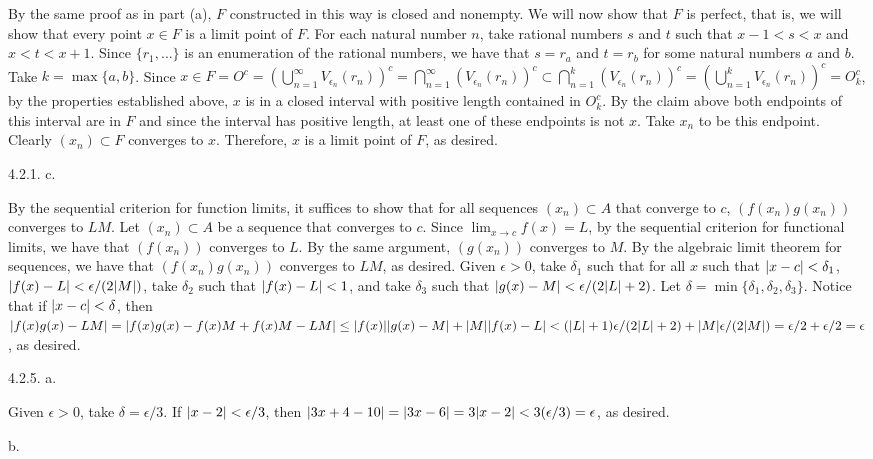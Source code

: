 By the same proof as in part (a),
$F$ constructed in this way is closed and nonempty.
We will now show that $F$ is perfect, that is,
we will show that every point $x \in F$
is a limit point of $F$.
For each natural number $n$,
take rational numbers $s$ and $t$ such that
$x - 1 < s < x$ and $x < t < x + 1$.
Since $\{r_1, \ldots\}$ is an enumeration of the rational numbers,
we have that $s = r_a$ and $t = r_b$ for some natural numbers $a$ and $b$.
Take $k = \max \{a, b\}$.
Since $x \in F = O^c = (\bigcup _{n=1} ^\infty V _{\epsilon _n} (r_n))^c =
\bigcap _{n=1} ^\infty (V _{\epsilon _n} (r_n))^c \subset
\bigcap _{n=1} ^k (V _{\epsilon _n} (r_n))^c =
(\bigcup _{n=1} ^k V _{\epsilon _n} (r_n))^c = O_k^c$,
by the properties established above,
$x$ is in a closed interval with positive length contained in $O_k^c$.
By the claim above both endpoints of this interval are in $F$
and since the interval has positive length, at least one of these endpoints
is not $x$.
Take $x_n$ to be this endpoint.
Clearly $(x_n) \subset F$ converges to $x$.
Therefore, $x$ is a limit point of $F$, as desired.
\bigskip
\item{4.2.1.} c.

By the sequential criterion for function limits, it suffices to show that
for all sequences $(x_n) \subset A$ that converge to $c$,
$(f(x_n) g(x_n))$ converges to $LM$.
Let $(x_n) \subset A$ be a sequence that converges to $c$.
Since $\lim _{x \to c} f(x) = L$,
by the sequential criterion for functional limits,
we have that $(f(x_n))$ converges to $L$.
By the same argument, $(g(x_n))$ converges to $M$.
By the algebraic limit theorem for sequences, we have that
$(f(x_n) g(x_n))$ converges to $LM$, as desired.
\medskip
Given $\epsilon > 0$, take $\delta _1$ such that
for all $x$ such that $\vert x - c\vert < \delta _1$,
$\vert f(x) - L\vert < \epsilon / (2 \vert M\vert)$,
take $\delta _2$ such that
$\vert f(x) - L\vert < 1$, and
take $\delta _3$ such that
$\vert g(x) - M\vert < \epsilon / (2 \vert L\vert + 2)$.
Let $\delta = \min \{\delta _1, \delta _2, \delta _3\}$.
Notice that if $\vert x - c\vert < \delta$, then
$\vert f(x) g(x) - LM\vert = \vert f(x) g(x) - f(x) M + f(x) M - LM\vert \le
\vert f(x)\vert \vert g(x) - M\vert + \vert M\vert \vert f(x) - L\vert <
(\vert L\vert + 1) \epsilon / (2 \vert L\vert + 2) + \vert M\vert \epsilon / (2 \vert M\vert) =
\epsilon / 2 + \epsilon / 2 = \epsilon$, as desired.
\bigskip
\item{4.2.5.} a.

Given $\epsilon > 0$, take $\delta = \epsilon / 3$.
If $\vert x - 2\vert < \epsilon / 3$, then
$\vert3x + 4 - 10\vert = \vert3x - 6\vert = 3 \vert x - 2\vert <
3 (\epsilon / 3) = \epsilon$, as desired.
\medskip
\item{} b.

